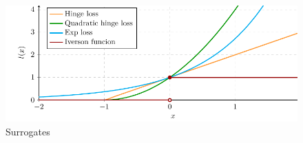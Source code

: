\begin{figure}
  \centering
  \includegraphics[width = 0.95\linewidth]{images/surrogates.pdf}
  \caption{Surrogates}
  \label{fig: surrogates}
\end{figure}






